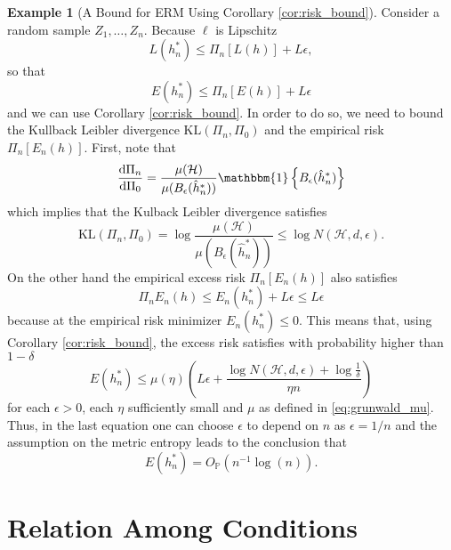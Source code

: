 \documentclass{uvamath}
\newcommand*{\calH}{\mathcal{H}}
\newcommand*{\bbP}{\mathbb{P}}
\newcommand*{\indicator}[1]{\mathbbm{1}\left\{#1\right\}}
\newcommand*{\paren}[1]{\left(#1\right)}
\newcommand*{\rmd}{\mathrm{d}}
\newcommand*{\KL}{\mathrm{KL}}
\theoremstyle{remark}
\theoremstyle{definition}
\theoremstyle{definition}
\theoremstyle{definition}
\newtheorem{example}[theorem]{Example}
\theoremstyle{definition}
\theoremstyle{definition}
\begin{document}
\begin{example}[A Bound for ERM Using Corollary \ref{cor:risk_bound}]
  Consider a random sample $Z_1,\dots,Z_n$. Because $\ell$ is
  Lipschitz
  \begin{equation*}
    L(h^*_n) \leq \Pi_n[L(h)] + L\epsilon,
  \end{equation*}
  so that
  \begin{equation*}
    E(h^*_n) \leq \Pi_n[E(h)] + L\epsilon
  \end{equation*}
  and we can use Corollary \ref{cor:risk_bound}. In order to do so, we
  need to bound the Kullback Leibler divergence $\KL(\Pi_n,\Pi_0)$ and
  the empirical risk $\Pi_n[E_n(h)]$. First, note that
  \begin{equation*}
    \frac{\rmd \Pi_n}{\rmd \Pi_0} = \frac{\mu(\calH)}{\mu(B_\epsilon(\hat{h}^*_{n}))}\indicator{B_\epsilon(\hat{h}^*_{n})}
  \end{equation*}
  which implies that the Kulback Leibler divergence satisfies
  \begin{equation*}
    \KL(\Pi_n, \Pi_0) =
    \log\frac{\mu(\calH)}{\mu(B_\epsilon(\hat{h}^*_{n}))}\leq \log N(\calH, d, \epsilon).
  \end{equation*}
  On the other hand the empirical excess risk $\Pi_n[E_n(h)]$ also
  satisfies
  \begin{equation*}
    \Pi_nE_n(h) \leq  E_n(h^*_n) + L\epsilon \leq L\epsilon
  \end{equation*}
  because at the empirical risk minimizer $E_n(h^*_n)\leq 0$. This
  means that, using Corollary \ref{cor:risk_bound}, the excess risk
  satisfies with probability higher than $1-\delta$
  \begin{equation*}
    E(h^*_n)\leq  \mu(\eta)\paren{L\epsilon + \frac{\log N(\calH,
        d, \epsilon) +  \log\frac{1}{\delta}}{\eta n}}
  \end{equation*}
  for each $\epsilon>0$, each $\eta$ sufficiently small and $\mu$ as
  defined in \eqref{eq:grunwald_mu}. Thus, in the last equation one
  can choose $\epsilon$ to depend on $n$ as $\epsilon = 1/n$ and the
  assumption on the metric entropy leads to the conclusion that
  \begin{equation*}
    E(h^*_n) = O_{\bbP}(n^{-1}\log(n)).
  \end{equation*}
\end{example}

\chapter{Relation Among Conditions \label{sect:relations}}
\end{document}
